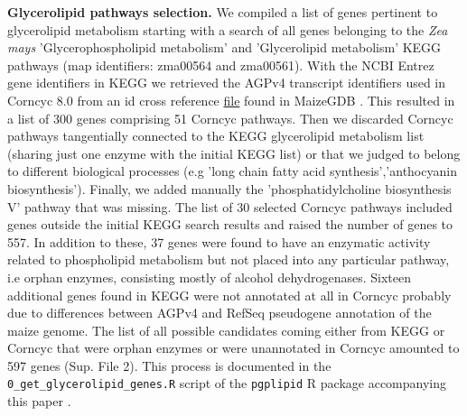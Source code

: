 \documentclass[9pt,twocolumn,twoside,lineno]{biorxiv}
\begin{document}
\textbf{Glycerolipid pathways selection.}
We compiled a list of genes pertinent to glycerolipid metabolism starting with a search of all genes belonging to the \textit{Zea mays} 'Glycerophospholipid metabolism' and 'Glycerolipid metabolism' KEGG pathways \cite{kanehisa2019} (map identifiers: zma00564 and zma00561). 
With the NCBI Entrez gene identifiers in KEGG we retrieved the AGPv4 transcript identifiers used in Corncyc 8.0 \cite{portwood2019, walsh2016} from an id cross reference \href{https://www.maizegdb.org/search/gene/download_gene_xrefs.php?relative=v4}{file} found in MaizeGDB   \cite{portwood2019}.
This resulted in a list of 300 genes comprising 51 Corncyc pathways. 
Then we discarded Corncyc pathways  tangentially connected to the KEGG glycerolipid metabolism list (sharing just one enzyme with the initial KEGG list) or that we judged to belong to different biological processes (e.g 'long chain fatty acid synthesis','anthocyanin biosynthesis'). 
Finally, we added manually the 'phosphatidylcholine biosynthesis V' pathway that was missing. 
The list of 30 selected Corncyc pathways included genes outside the initial KEGG search results and raised the number of genes to 557. 
In addition to these, 37 genes were found to have an enzymatic activity related to phospholipid metabolism but not placed into any particular pathway, i.e orphan enzymes, consisting mostly of alcohol dehydrogenases. 
Sixteen additional genes found in KEGG were not annotated at all in Corncyc probably due to differences between AGPv4 and RefSeq pseudogene annotation of the maize genome. 
The list of all possible candidates coming either from KEGG or Corncyc that were orphan enzymes or were unannotated in Corncyc amounted to 597 genes (Sup. File 2). 
This process is documented in the \verb|0_get_glycerolipid_genes.R| script of the \verb|pgplipid| R package accompanying this paper \cite{fausto_rodriguez_zapata_2020_4323410}.
\end{document}
